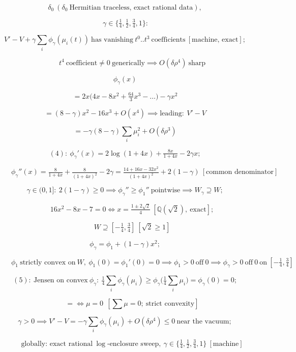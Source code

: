 \begin{theorem}
\[
\delta_0\ (\delta_0\ \text{Hermitian traceless, exact rational data}),
\]

\[
\ \gamma\in\{\tfrac14,\tfrac12,\tfrac34,1\}:
\]

\[
V'-V+\gamma\textstyle\sum_i\phi_\gamma(\mu_i(t))\ \text{has vanishing}\ t^0..t^3\ \text{coefficients}\ [\text{machine, exact}];
\]

\[
\qquad t^4\ \text{coefficient}\ne0\ \text{generically}\implies O(\delta\rho^4)\ \text{sharp}
\]

\[
\phi_\gamma(x)
\]

\[
= 2x\bigl(4x-8x^2+\tfrac{64}3x^3-\dots\bigr)-\gamma x^2
\]

\[
= (8-\gamma)x^2-16x^3+O(x^4)\implies\text{leading}:\ V'-V
\]

\[
= -\gamma(8-\gamma)\textstyle\sum_i\mu_i^2+O(\delta\rho^3)
\]

\[
(4):\ \phi_\gamma'(x)=2\log(1+4x)+\tfrac{8x}{1+4x}-2\gamma x;
\]

\[
\qquad \phi_\gamma''(x)=\tfrac8{1+4x}+\tfrac8{(1+4x)^2}-2\gamma=\tfrac{14+16x-32x^2}{(1+4x)^2}+2(1-\gamma)\ [\text{common denominator}]
\]

\[
\gamma\in(0,1]:\ 2(1-\gamma)\ge0\implies\phi_\gamma''\ge\phi_1''\ \text{pointwise}\implies W_\gamma\supseteq W;
\]

\[
\qquad 16x^2-8x-7=0\iff x=\tfrac{1\pm2\sqrt2}4\ [\mathbb Q(\sqrt2),\ \text{exact}];
\]

\[
\qquad W\supseteq[-\tfrac14,\tfrac34]\ [\sqrt2\ge1]
\]

\[
\phi_\gamma=\phi_1+(1-\gamma)x^2;
\]

\[
\qquad \phi_1\ \text{strictly convex on}\ W,\ \phi_1(0)=\phi_1'(0)=0\implies\phi_1>0\ \text{off}\ 0\implies\phi_\gamma>0\ \text{off}\ 0\ \text{on}\ [-\tfrac14,\tfrac34]
\]

\[
(5):\ \text{Jensen on convex}\ \phi_\gamma:\ \tfrac14\sum_i\phi_\gamma(\mu_i)\ge\phi_\gamma\bigl(\tfrac14\sum_i\mu_i\bigr)=\phi_\gamma(0)=0;
\]

\[
\qquad =\iff\mu=0\ \ [\textstyle\sum\mu=0;\ \text{strict convexity}]
\]

\[
\gamma>0\implies V'-V=-\gamma\textstyle\sum_i\phi_\gamma(\mu_i)+O(\delta\rho^4)\le0\ \text{near the vacuum};
\]

\[
\qquad \text{globally: exact rational}\ \log\text{-enclosure sweep},\ \gamma\in\{\tfrac14,\tfrac12,\tfrac34,1\}\ [\text{machine}]
\]


\end{theorem}

